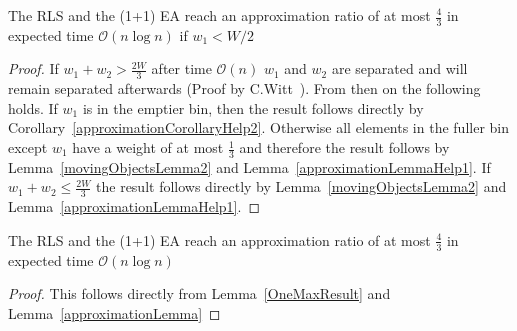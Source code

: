 \begin{lemma}\label{approximationLemma}
    The RLS and the (1+1) EA reach an approximation ratio of at most $\frac{4}{3}$ in expected time $\mathcal{O}(n\log{}n)$ if $w_1 < W/2$
\end{lemma}
\begin{proof}    
    If \(w_1+w_2 > \frac{2W}{3}\) after time $\mathcal{O}(n)$ $w_1$ and $w_2$ are separated and will remain separated afterwards (Proof by C.Witt~\cite{diekert2005stacs}). From then on the following holds. If $w_1$ is in the emptier bin, then the result follows directly by Corollary~\ref{approximationCorollaryHelp2}. Otherwise all elements in the fuller bin except $w_1$ have a weight of at most $\frac{1}{3}$ and therefore the result follows by Lemma~\ref{movingObjectsLemma2} and Lemma~\ref{approximationLemmaHelp1}. If \(w_1+w_2 \le \frac{2W}{3}\) the result follows directly by Lemma~\ref{movingObjectsLemma2} and Lemma~\ref{approximationLemmaHelp1}.
\end{proof}

\begin{corollary}
    The RLS and the (1+1) EA reach an approximation ratio of at most $\frac{4}{3}$ in expected time $\mathcal{O}(n\log{}n)$
\end{corollary}
\begin{proof}
    This follows directly from Lemma~\ref{OneMaxResult} and Lemma~\ref{approximationLemma}
\end{proof}


